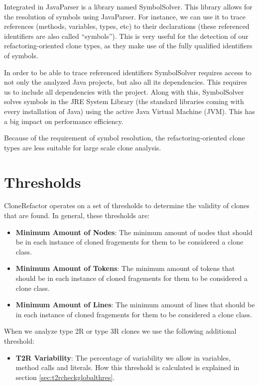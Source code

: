 Integrated in JavaParser is a library named SymbolSolver. This library allows for the resolution of symbols using JavaParser. For instance, we can use it to trace references (methods, variables, types, etc) to their declarations (these referenced identifiers are also called ``symbols''). This is very useful for the detection of our refactoring-oriented clone types, as they make use of the fully qualified identifiers of symbols.

In order to be able to trace referenced identifiers SymbolSolver requires access to not only the analyzed Java projects, but also all its dependencies. This requires us to include all dependencies with the project. Along with this, SymbolSolver solves symbols in the JRE System Library (the standard libraries coming with every installation of Java) using the active Java Virtual Machine (JVM). This has a big impact on performance efficiency.

Because of the requirement of symbol resolution, the refactoring-oriented clone types are less suitable for large scale clone analysis.

\section{Thresholds}\label{sec:clonerefactorthresholds}
CloneRefactor operates on a set of thresholds to determine the validity of clones that are found. In general, these thresholds are:
\begin{itemize}
  \item \textbf{Minimum Amount of Nodes}: The minimum amount of nodes that should be in each instance of cloned fragements for them to be considered a clone class.
  \item \textbf{Minimum Amount of Tokens}: The minimum amount of tokens that should be in each instance of cloned fragements for them to be considered a clone class.
  \item \textbf{Minimum Amount of Lines}: The minimum amount of lines that should be in each instance of cloned fragements for them to be considered a clone class.
\end{itemize}

When we analyze type 2R or type 3R clones we use the following additional threshold:
\begin{itemize}
  \item \textbf{T2R Variability}: The percentage of variability we allow in variables, method calls and literals. How this threshold is calculated is explained in section \ref{sec:t2rcheckglobalthres}.
\end{itemize}

